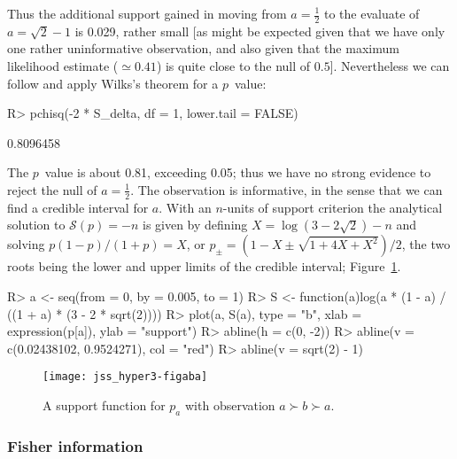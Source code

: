 \documentclass[article]{jss}
\begin{document}
%
Thus the additional support gained in moving from $a=\frac{1}{2}$ to
the evaluate of $a=\sqrt{2}-1$ is 0.029, rather small [as might be
expected given that we have only one rather uninformative observation,
and also given that the maximum likelihood estimate ($\simeq 0.41$) is
quite close to the null of $0.5$].  Nevertheless we can follow
\cite{edwards1972} and apply Wilks's theorem for a $p$~value:
%
\begin{Schunk}
\begin{Sinput}
R> pchisq(-2 * S_delta, df = 1, lower.tail = FALSE)
\end{Sinput}
\begin{Soutput}
[1] 0.8096458
\end{Soutput}
\end{Schunk}
%
The $p$~value is about 0.81, exceeding 0.05; thus we have no strong
evidence to reject the null of $a=\frac{1}{2}$.  The observation is
informative, in the sense that we can find a credible interval for
$a$.  With an $n$-units of support criterion the analytical solution to
$\mathcal{S}(p)=-n$ is given by defining $X=\log(3-2\sqrt{2})-n$ and
solving $p(1-p)/(1+p)=X$, or
$p_\pm=\left(1-X\pm\sqrt{1+4X+X^2}\right)/2$, the two roots being the
lower and upper limits of the credible interval;
Figure~\ref{ABA_likelihood}.
%
\begin{Schunk}
\begin{Sinput}
R> a <- seq(from = 0, by = 0.005, to = 1)
R> S <- function(a){log(a * (1 - a) / ((1 + a) * (3 - 2 * sqrt(2))))}
R> plot(a, S(a), type = "b", xlab = expression(p[a]), ylab = "support")
R> abline(h = c(0, -2))
R> abline(v = c(0.02438102, 0.9524271), col = "red")
R> abline(v = sqrt(2) - 1)
\end{Sinput}
\end{Schunk}
%
\begin{figure}[t!]
\centering
\texttt{[image: jss\_hyper3-figaba]}
\caption{A\label{ABA_likelihood} support function for $p_a$ with observation $a\succ b\succ a$.}
\end{figure}

\subsubsection{Fisher information}
\end{document}
